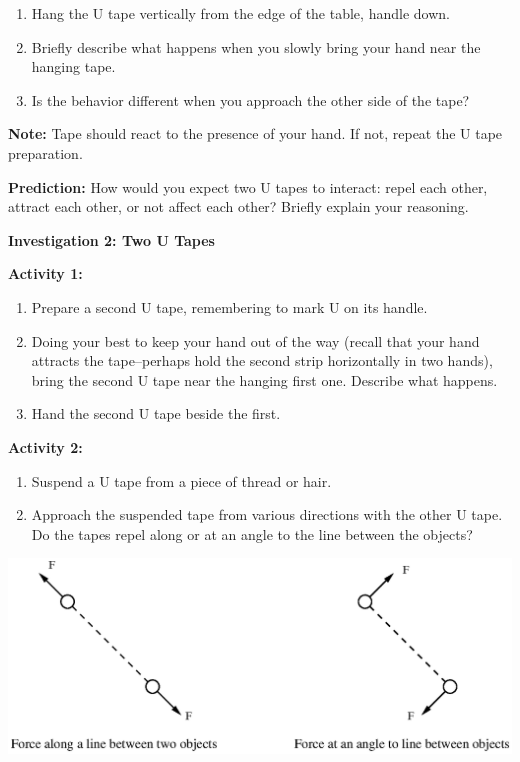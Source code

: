 \begin{enumerate}
\item Hang the U tape vertically from the edge of the table, handle down.
\item Briefly describe what happens when you slowly bring your hand near
the hanging tape.\vspace{15mm}

\item Is the behavior different when you approach the other side of the
tape?\vspace{15mm}

\end{enumerate}
\textbf{Note:} Tape should react to the presence of your hand. If
not, repeat the U tape preparation.

\textbf{Prediction:} How would you expect two U tapes to interact:
repel each other, attract each other, or not affect each other? Briefly
explain your reasoning.
\vspace{1in}

\textbf{Investigation 2: Two U Tapes}

\textbf{Activity 1:}

\begin{enumerate}
\item Prepare a second U tape, remembering to mark U on its handle.
\item Doing your best to keep your hand out of the way (recall that your
hand attracts the tape--perhaps hold the second strip horizontally
in two hands), bring the second U tape near the hanging first one.
Describe what happens.\vspace{15mm}

\item Hand the second U tape beside the first.
\end{enumerate}
\textbf{Activity 2:}

\begin{enumerate}
\item Suspend a U tape from a piece of thread or hair.
\item Approach the suspended tape from various directions with the other
U tape. Do the tapes repel along or at an angle to the line between
the objects?
\end{enumerate}
\vspace{0.3cm}
{\centering \includegraphics{interactions_of_electric_charges/int_elec_charges_fig_1.eps} \par}
\vspace{0.3cm}

